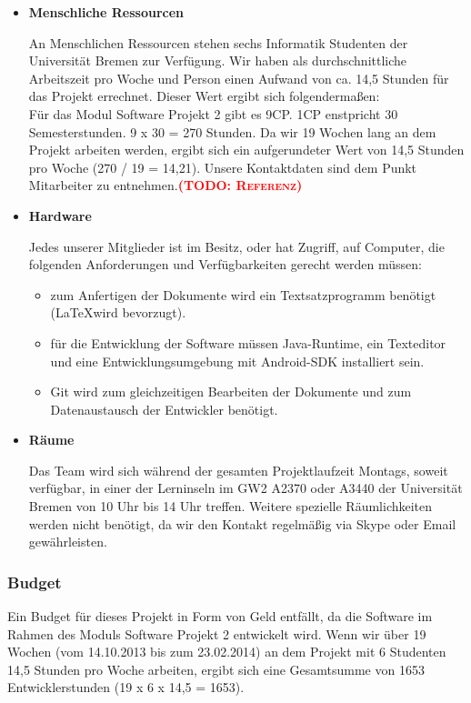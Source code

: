 \documentclass[fontsize=12pt,paper=a4,twoside]{scrartcl}
\newcommand{\todo}[1]{\textbf{\textsc{\textcolor{red}{(TODO: #1)}}}}
\begin{document}
\begin{itemize}
\item \textbf{Menschliche Ressourcen}

An Menschlichen Ressourcen stehen sechs Informatik Studenten der Universität Bremen zur Verfügung. Wir haben als durchschnittliche Arbeitszeit pro Woche und Person einen Aufwand von ca. 14,5 Stunden für das Projekt errechnet. Dieser Wert ergibt sich folgendermaßen:\\
Für das Modul Software Projekt 2 gibt es 9CP. 1CP enstpricht 30 Semesterstunden. 9 x 30 = 270 Stunden. Da wir 19 Wochen lang an dem Projekt arbeiten werden, ergibt sich ein aufgerundeter Wert von 14,5 Stunden pro Woche (270 / 19 = 14,21). Unsere Kontaktdaten sind dem Punkt Mitarbeiter zu entnehmen.\todo{Referenz}

\item \textbf{Hardware}

Jedes unserer Mitglieder ist im Besitz, oder hat Zugriff, auf Computer, die folgenden Anforderungen und Verfügbarkeiten gerecht werden müssen:

\begin{itemize}
\item zum Anfertigen der Dokumente wird ein Textsatzprogramm benötigt (\LaTeX wird bevorzugt).
\item für die Entwicklung der Software müssen Java-Runtime, ein Texteditor und eine Entwicklungsumgebung mit Android-SDK installiert sein.
\item Git wird zum gleichzeitigen Bearbeiten der Dokumente und zum Datenaustausch der Entwickler benötigt.
\end{itemize}

\item \textbf{Räume}

Das Team wird sich während der gesamten Projektlaufzeit Montags, soweit verfügbar, in einer der Lerninseln im GW2 A2370 oder A3440 der Universität Bremen von 10 Uhr bis 14 Uhr treffen. Weitere spezielle Räumlichkeiten werden nicht benötigt, da wir den Kontakt regelmäßig via Skype oder Email gewährleisten.

\end{itemize}

\subsubsection{Budget}

Ein Budget für dieses Projekt in Form von Geld entfällt, da die Software im Rahmen des Moduls Software Projekt 2 entwickelt wird. Wenn wir über 19 Wochen (vom 14.10.2013 bis zum 23.02.2014) an dem Projekt mit 6 Studenten 14,5 Stunden pro Woche arbeiten, ergibt sich eine Gesamtsumme von 1653 Entwicklerstunden (19 x 6 x 14,5 = 1653).
\end{document}
